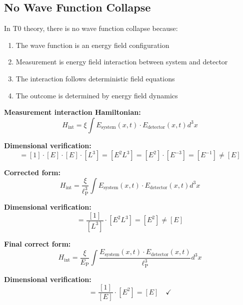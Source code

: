 \documentclass[12pt,a4paper]{report}
\newcommand{\EP}{E_{\text{P}}}            %
\newcommand{\lP}{\ell_{\text{P}}}         %
\begin{document}
\subsection{No Wave Function Collapse}
\label{subsec:no_collapse}

In T0 theory, there is no wave function collapse because:

\begin{enumerate}
	\item The wave function is an energy field configuration
	\item Measurement is energy field interaction between system and detector
	\item The interaction follows deterministic field equations
	\item The outcome is determined by energy field dynamics
\end{enumerate}

\textbf{Measurement interaction Hamiltonian:}
\begin{equation}
	H_{\text{int}} = \xi \int E_{\text{system}}(x,t) \cdot E_{\text{detector}}(x,t) d^3x
\end{equation}

\textbf{Dimensional verification:}
\begin{equation}
	[H_{\text{int}}] = [1] \cdot [E] \cdot [E] \cdot [L^3] = [E^2 L^3] = [E^2] \cdot [E^{-3}] = [E^{-1}] \neq [E]
\end{equation}

\textbf{Corrected form:}
\begin{equation}
	H_{\text{int}} = \frac{\xi}{\lP^3} \int E_{\text{system}}(x,t) \cdot E_{\text{detector}}(x,t) d^3x
\end{equation}

\textbf{Dimensional verification:}
\begin{equation}
	[H_{\text{int}}] = \frac{[1]}{[L^3]} \cdot [E^2 L^3] = [E^2] \neq [E]
\end{equation}

\textbf{Final correct form:}
\begin{equation}
	H_{\text{int}} = \frac{\xi}{\EP} \int \frac{E_{\text{system}}(x,t) \cdot E_{\text{detector}}(x,t)}{\lP^3} d^3x
\end{equation}

\textbf{Dimensional verification:}
\begin{equation}
	[H_{\text{int}}] = \frac{[1]}{[E]} \cdot [E^2] = [E] \quad \checkmark
\end{equation}
\end{document}
